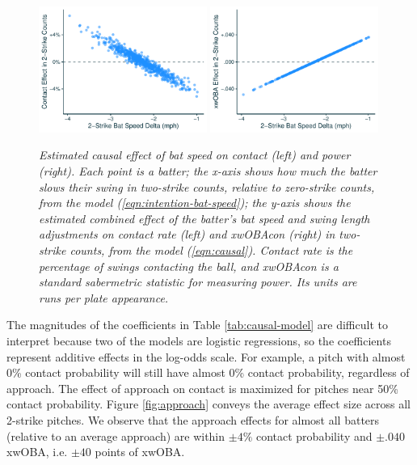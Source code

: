 \documentclass{article}
\begin{document}
      \begin{figure}[H]
        \centering
        \includegraphics[width = 0.49\textwidth]{../../figures/bat_speed_contact.pdf}
        \includegraphics[width = 0.49\textwidth]{../../figures/bat_speed_power.pdf}
        \caption{\it Estimated causal effect of bat speed on contact (left) and power (right). Each point is a batter; the x-axis shows how much the batter slows their swing in two-strike counts, relative to zero-strike counts, from the model (\ref{eqn:intention-bat-speed}); the y-axis shows the estimated combined effect of the batter's bat speed and swing length adjustments on contact rate (left) and xwOBAcon (right) in two-strike counts, from the model (\ref{eqn:causal}). Contact rate is the percentage of swings contacting the ball, and xwOBAcon is a standard sabermetric statistic for measuring power. Its units are runs per plate appearance.}
        \label{fig:results-causal}
      \end{figure}

      The magnitudes of the coefficients in Table \ref{tab:causal-model} are difficult to interpret because two of the models are logistic regressions, so the coefficients represent additive effects in the log-odds scale. For example, a pitch with almost 0\% contact probability will still have almost 0\% contact probability, regardless of approach. The effect of approach on contact is maximized for pitches near 50\% contact probability. Figure \ref{fig:approach} conveys the average effect size across all 2-strike pitches. We observe that the approach effects for almost all batters (relative to an average approach) are within $\pm4\%$ contact probability and $\pm.040$ xwOBA, i.e. $\pm 40$ points of xwOBA.
\end{document}
